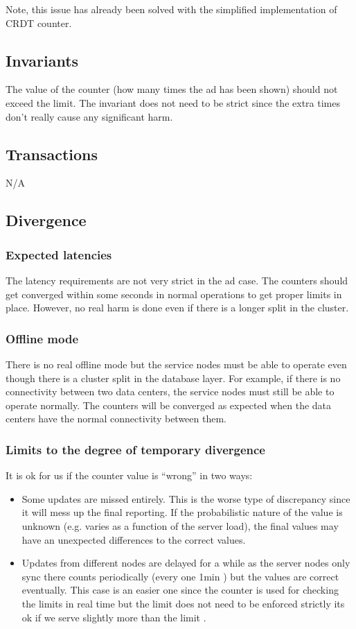 \documentclass[11pt,a4paper]{report}
\begin{document}
Note, this issue has already been solved with the simplified implementation of CRDT counter.

\subsection{Invariants}
The value of the counter (how many times the ad has been shown) should not exceed the limit. 
The invariant does not need to be strict since the extra times don't really cause any significant harm.

\subsection{Transactions}
N/A

\subsection{Divergence}
\subsubsection{Expected latencies}
The latency requirements are not very strict in the ad case. The counters should get converged within some seconds in normal operations to get proper limits in place. However, no real harm is done even if there is a longer split in the cluster.

\subsubsection{Offline mode}
There is no real offline mode but the service nodes must be able to operate even though there is a cluster split in the database layer. For example, if there is no connectivity between two data centers, the service nodes must still be able to operate normally. The counters will be converged as expected when the data centers have the normal connectivity between them.

\subsubsection{Limits to the degree of temporary divergence}
It is ok for us if the counter value is ``wrong'' in two ways:
\begin{itemize}
\item Some updates are missed entirely. This is the worse type of discrepancy since it will mess up the final reporting. If the probabilistic nature of the value is unknown (e.g. varies as a function of the server load), the final values may have an unexpected differences to the correct values.
\item Updates from different nodes are delayed  for a while as the server nodes only sync there counts periodically (every one 1min ) but the values are correct eventually. This case is an easier one since the counter is used for checking the limits in real time but the limit does not need to be enforced strictly its ok if we serve slightly more than the limit .
\end{itemize}
\end{document}
